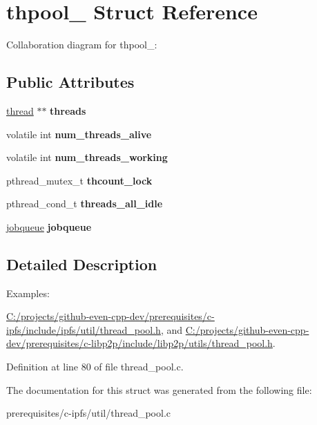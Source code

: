 \hypertarget{structthpool__}{}\section{thpool\+\_\+ Struct Reference}
\label{structthpool__}


Collaboration diagram for thpool\+\_\+\+:
\subsection*{Public Attributes}
\begin{DoxyCompactItemize}
\item 
\mbox{\label{structthpool___afd986a2a751d40ef08d3bfed1cff10c9}} 
\mbox{\hyperlink{structthread}{thread}} $\ast$$\ast$ {\bfseries threads}
\item 
\mbox{\label{structthpool___ad8419ca087fb8143f5b33183038f10fc}} 
volatile int {\bfseries num\+\_\+threads\+\_\+alive}
\item 
\mbox{\label{structthpool___a684bd22686434ea51d746c13f4ef066e}} 
volatile int {\bfseries num\+\_\+threads\+\_\+working}
\item 
\mbox{\label{structthpool___aad805a77e1175478f48332d036c4a2e9}} 
pthread\+\_\+mutex\+\_\+t {\bfseries thcount\+\_\+lock}
\item 
\mbox{\label{structthpool___ad31e68c747608b65c6e18c33d6b64151}} 
pthread\+\_\+cond\+\_\+t {\bfseries threads\+\_\+all\+\_\+idle}
\item 
\mbox{\label{structthpool___a08d4a33fae889af4adc4e78d9e34602d}} 
\mbox{\hyperlink{structjobqueue}{jobqueue}} {\bfseries jobqueue}
\end{DoxyCompactItemize}


\subsection{Detailed Description}
\begin{Desc}
\item[Examples\+: ]\par
\mbox{\hyperlink{_c_1_2projects_2github-even-cpp-dev_2prerequisites_2c-ipfs_2include_2ipfs_2util_2thread_pool_8h-example}{C\+:/projects/github-\/even-\/cpp-\/dev/prerequisites/c-\/ipfs/include/ipfs/util/thread\+\_\+pool.\+h}}, and \mbox{\hyperlink{_c_1_2projects_2github-even-cpp-dev_2prerequisites_2c-libp2p_2include_2libp2p_2utils_2thread_pool_8h-example}{C\+:/projects/github-\/even-\/cpp-\/dev/prerequisites/c-\/libp2p/include/libp2p/utils/thread\+\_\+pool.\+h}}.\end{Desc}


Definition at line 80 of file thread\+\_\+pool.\+c.



The documentation for this struct was generated from the following file\+:\begin{DoxyCompactItemize}
\item 
prerequisites/c-\/ipfs/util/thread\+\_\+pool.\+c\end{DoxyCompactItemize}
